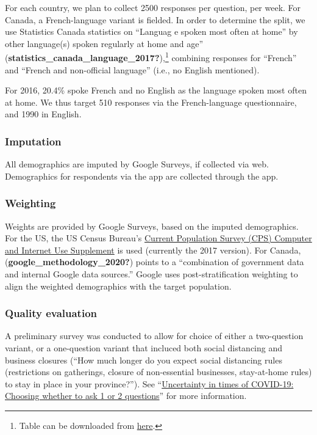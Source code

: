 \documentclass[
]{article}
\begin{document}
For each country, we plan to collect 2500 responses per question, per
week. For Canada, a French-language variant is fielded. In order to
determine the split, we use Statistics Canada statistics on ``Languag e
spoken most often at home'' by other language(s) spoken regularly at
home and age''
(\textbf{statistics\_canada\_language\_2017?}),\footnote{Table can be
  downloaded from
  \href{https://www12.statcan.gc.ca/census-recensement/2016/dp-pd/hlt-fst/lang/Tables/Download/_file.cfm?Lang=E\&T=31\&Geo=00\&SP=1\&view=1\&age=1\&rl=1\&OFT=csv}{here}.}
combining responses for ``French'' and ``French and non-official
language'' (i.e., no English mentioned).

For 2016, 20.4\% spoke French and no English as the language spoken most
often at home. We thus target 510 responses via the French-language
questionnaire, and 1990 in English.

\hypertarget{imputation}{%
\subsubsection{Imputation}\label{imputation}}

All demographics are imputed by Google Surveys, if collected via web.
Demographics for respondents via the app are collected through the app.

\hypertarget{weighting}{%
\subsubsection{Weighting}\label{weighting}}

Weights are provided by Google Surveys, based on the imputed
demographics. For the US, the US Census Bureau's
\href{https://www.census.gov/programs-surveys/cps/technical-documentation/complete.2017.html}{Current
Population Survey (CPS) Computer and Internet Use Supplement} is used
(currently the 2017 version). For Canada,
(\textbf{google\_methodology\_2020?}) points to a ``combination of
government data and internal Google data sources.'' Google uses
post-stratification weighting to align the weighted demographics with
the target population.

\hypertarget{quality-evaluation}{%
\subsubsection{Quality evaluation}\label{quality-evaluation}}

A preliminary survey was conducted to allow for choice of either a
two-question variant, or a one-question variant that incluced both
social distancing and business closures (``How much longer do you expect
social distancing rules (restrictions on gatherings, closure of
non-essential businesses, stay-at-home rules) to stay in place in your
province?''). See ``\href{evaluation.md}{Uncertainty in times of
COVID-19: Choosing whether to ask 1 or 2 questions}'' for more
information.
\end{document}
